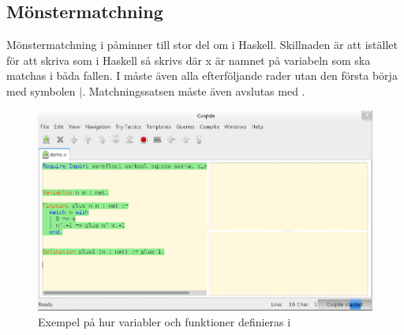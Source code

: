 \subsection{Mönstermatchning}
Mönstermatchning i \coq påminner till stor del om  i Haskell.
Skillnaden är att istället för att skriva  som i Haskell så skrivs
 där x är namnet på variabeln som ska matchas i båda fallen.
I \coq måste även alla efterföljande rader utan den första börja med symbolen
$|$. Matchningssatsen måste även avslutas med .

\begin{figure}[H]
  \centering
  \includegraphics[width=150mm]{images/Variables_and_Functions}
  \caption[Variabler och funktioner]
   {Exempel på hur variabler och funktioner definieras i \coq}
\end{figure}
